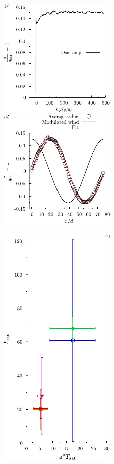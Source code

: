\begin{figure}[H]
    \centering
    \parbox{0.495\textwidth}{
        \centering
        \includegraphics[width=0.495\textwidth]{04-figuras/TMa-qamp.pdf}
        \includegraphics[width=0.495\textwidth]{04-figuras/TMb-qwind.pdf}
    }
    \parbox{0.495\textwidth}{
        \includegraphics[width=0.495\textwidth]{04-figuras/TMc-Lsat.pdf}
}
\end{figure}
